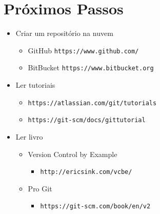 \documentclass{beamer}
\newenvironment{slide}{\begin{frame}{\insertsection}}{\end{frame}}
\begin{document}
\section{Próximos Passos}
\begin{slide}
    \begin{itemize}
        \item Criar um repositório na nuvem
        \begin{itemize}
            \pause
            \item GitHub \texttt{https://www.github.com/}
            \pause
            \item BitBucket \texttt{https://www.bitbucket.org}
        \end{itemize}
        \pause
        \item Ler tutoriais
        \begin{itemize}
            \pause
            \item \texttt{https://atlassian.com/git/tutorials}
            \pause
            \item \texttt{https://git-scm/docs/gittutorial}
        \end{itemize}
        \pause
        \item Ler livro
        \begin{itemize}
            \pause
            \item Version Control by Example
            \begin{itemize}
                \pause
                \item \texttt{http://ericsink.com/vcbe/}
            \end{itemize}
            \pause
            \item Pro Git
            \begin{itemize}
                \pause
                \item \texttt{https://git-scm.com/book/en/v2}
            \end{itemize}
        \end{itemize}
    \end{itemize}
\end{slide}
\end{document}
